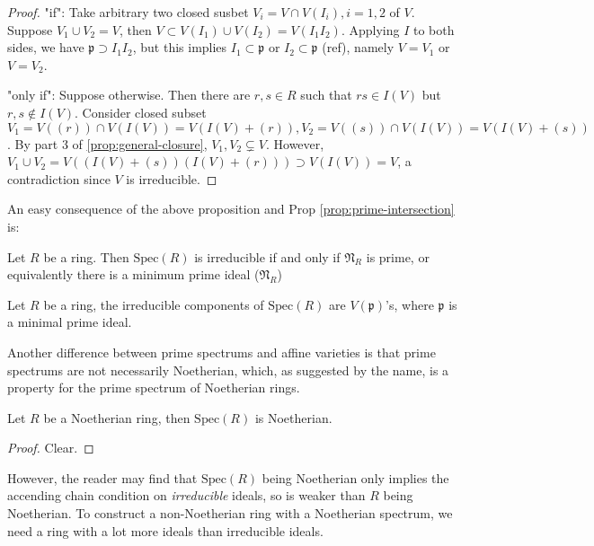 \documentclass{note-eng}
\begin{document}
\begin{proof}
    "if": Take arbitrary two closed susbet $V_i = V \cap V(I_i), i = 1, 2$ of $V$. Suppose $V_1 \cup V_2 = V$, then $V \subset V(I_1) \cup V(I_2) = V(I_1 I_2)$. Applying $I$ to both sides, we have $\mathfrak{p} \supset I_1 I_2$, but this implies $I_1 \subset \mathfrak{p}$ or $I_2 \subset \mathfrak{p}$ (\TODO ref), namely $V = V_1$ or $V = V_2$.

    "only if": Suppose otherwise. Then there are $r, s \in R$ such that $rs \in I(V)$ but $r, s \notin I(V)$. Consider closed subset $V_1 = V((r)) \cap V(I(V)) = V(I(V) + (r)), V_2 = V((s)) \cap V(I(V)) = V(I(V) + (s))$. By part 3 of \ref{prop:general-closure}, $V_1, V_2 \subsetneq V$. However, $V_1 \cup V_2 = V((I(V) + (s))(I(V) + (r))) \supset V(I(V)) = V$, a contradiction since $V$ is irreducible.
\end{proof}

An easy consequence of the above proposition and Prop \ref{prop:prime-intersection} is:

\begin{corollary}
    Let $R$ be a ring. Then $\mathrm{Spec}(R)$ is irreducible if and only if $\mathfrak{N}_R$ is prime, or equivalently there is a minimum prime ideal ($\mathfrak{N}_R$)
\end{corollary}

\begin{corollary}
    Let $R$ be a ring, the irreducible components of $\mathrm{Spec}(R)$ are $V(\mathfrak{p})$'s, where $\mathfrak{p}$ is a minimal prime ideal.
\end{corollary}

Another difference between prime spectrums and affine varieties is that prime spectrums are not necessarily Noetherian, which, as suggested by the name, is a property for the prime spectrum of Noetherian rings.

\begin{proposition}
    Let $R$ be a Noetherian ring, then $\mathrm{Spec}(R)$ is Noetherian.
\end{proposition}

\begin{proof}
    Clear.
\end{proof}

However, the reader may find that $\mathrm{Spec}(R)$ being Noetherian only implies the accending chain condition on \textit{irreducible} ideals, so is weaker than $R$ being Noetherian. To construct a non-Noetherian ring with a Noetherian spectrum, we need a ring with a lot more ideals than irreducible ideals.
\end{document}
